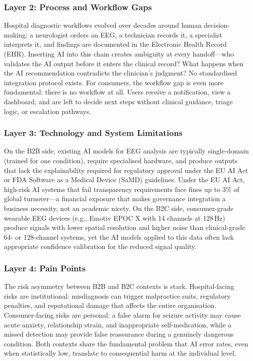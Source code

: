 \subsubsection{Layer 2: Process and Workflow Gaps}

Hospital diagnostic workflows evolved over decades around human decision-making: a neurologist orders an EEG, a technician records it, a specialist interprets it, and findings are documented in the Electronic Health Record (EHR). Inserting AI into this chain creates ambiguity at every handoff---who validates the AI output before it enters the clinical record? What happens when the AI recommendation contradicts the clinician's judgment? No standardised integration protocol exists. For consumers, the workflow gap is even more fundamental: there is no workflow at all. Users receive a notification, view a dashboard, and are left to decide next steps without clinical guidance, triage logic, or escalation pathways.

\subsubsection{Layer 3: Technology and System Limitations}

On the B2B side, existing AI models for EEG analysis are typically single-domain (trained for one condition), require specialised hardware, and produce outputs that lack the explainability required for regulatory approval under the EU AI Act or FDA Software as a Medical Device (SaMD) guidelines. Under the EU AI Act, high-risk AI systems that fail transparency requirements face fines up to 3\% of global turnover---a financial exposure that makes governance integration a business necessity, not an academic nicety. On the B2C side, consumer-grade wearable EEG devices (e.g., Emotiv EPOC X with 14 channels at 128\,Hz) produce signals with lower spatial resolution and higher noise than clinical-grade 64- or 128-channel systems, yet the AI models applied to this data often lack appropriate confidence calibration for the reduced signal quality.

\subsubsection{Layer 4: Pain Points}

The risk asymmetry between B2B and B2C contexts is stark. Hospital-facing risks are institutional: misdiagnosis can trigger malpractice suits, regulatory penalties, and reputational damage that affects the entire organisation. Consumer-facing risks are personal: a false alarm for seizure activity may cause acute anxiety, relationship strain, and inappropriate self-medication, while a missed detection may provide false reassurance during a genuinely dangerous condition. Both contexts share the fundamental problem that AI error rates, even when statistically low, translate to consequential harm at the individual level.

